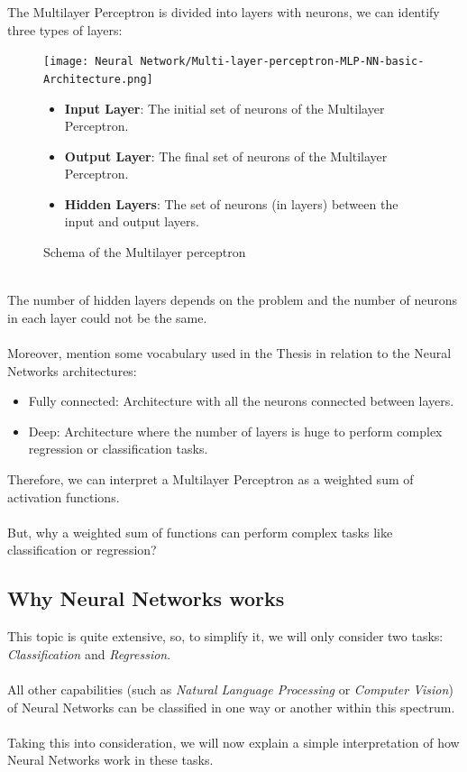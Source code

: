 \documentclass[a4paper, 11pt]{article}
\begin{document}
\hspace{-1.6em}The Multilayer Perceptron is divided into layers with neurons, we can identify three types of layers:
\begin{figure}[h]
    \begin{minipage}{9cm}
        \texttt{[image: Neural Network/Multi-layer-perceptron-MLP-NN-basic-Architecture.png]}
           \caption{Schema of the Multilayer perceptron}
    \end{minipage}
    \hspace{1em}
    \begin{minipage}{5cm}
        \begin{itemize}
            \item \textbf{Input Layer}: The initial set of neurons of the Multilayer Perceptron.
            \item \textbf {Output Layer}: The final set of neurons of the Multilayer Perceptron.
            \item \textbf{Hidden Layers}: The set of neurons (in layers) between the input and output layers.
        \end{itemize}
    \end{minipage}
\end{figure}\\
The number of hidden layers depends on the problem and the number of neurons in each layer could not be the same.\\\\
Moreover, mention some vocabulary used in the Thesis in relation to the Neural Networks architectures:
\begin{itemize}
    \item Fully connected: Architecture with all the neurons connected between layers.
    \item Deep: Architecture where the number of layers is huge to perform complex regression or classification tasks.
\end{itemize}
Therefore, we can interpret a Multilayer Perceptron as a weighted sum of activation functions.\\\\
But, why a weighted sum of functions can perform complex tasks like classification or regression?

\subsection{Why Neural Networks works}
This topic is quite extensive, so, to simplify it, we will only consider two tasks: \textit{Classification} and \textit{Regression}.\\\\
All other capabilities (such as \textit{Natural Language Processing} or \textit{Computer Vision}) of Neural Networks can be classified in one way or another within this spectrum.\\\\
Taking this into consideration, we will now explain a simple interpretation of how Neural Networks work in these tasks.
\end{document}
